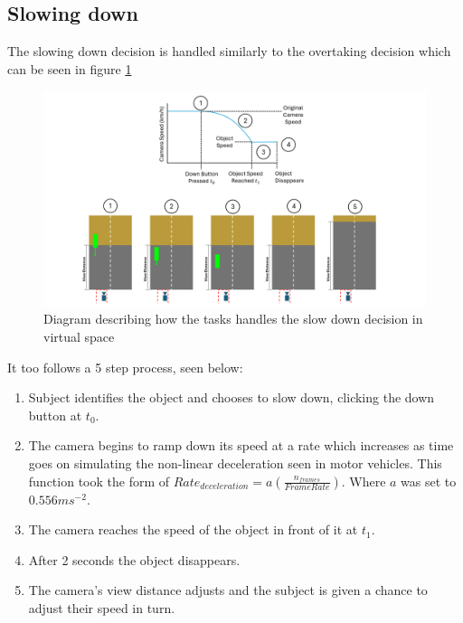 \subsection{Slowing down}
The slowing down decision is handled similarly to the overtaking decision which can be seen in figure \ref{fig:MET_Slow}
\begin{figure}[H]
    \centering
    \includegraphics[width=\linewidth]{figures/Methods_Slowdown.png}
    \caption{Diagram describing how the tasks handles the slow down decision in virtual space}
    \label{fig:MET_Slow}
\end{figure}

It too follows a 5 step process, seen below:
\begin{enumerate}
    \item Subject identifies the object and chooses to slow down, clicking the down button at $t_{0}$.
    \item The camera begins to ramp down its speed at a rate which increases as time goes on simulating the non-linear deceleration seen in motor vehicles. This function took the form of $Rate_{deceleration} = a(\frac{n_{frames}}{Frame Rate})$. Where $a$ was set to $0.556 ms^{-2}$.
    \item The camera reaches the speed of the object in front of it at $t_{1}$.
    \item After 2 seconds the object disappears.
    \item The camera's view distance adjusts and the subject is given a chance to adjust their speed in turn.
\end{enumerate}

